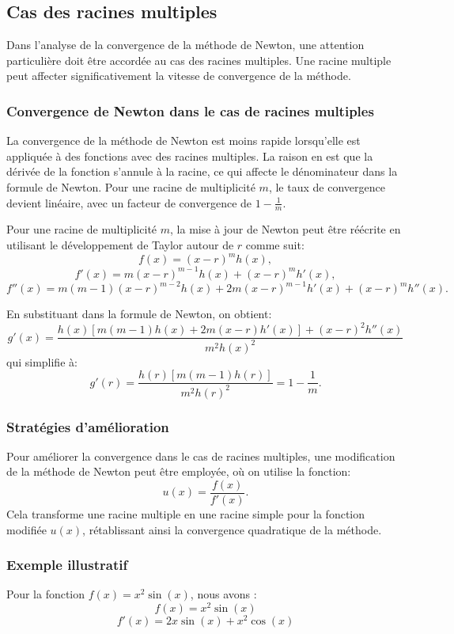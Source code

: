 \documentclass{article}
\begin{document}
\subsection{Cas des racines multiples}
Dans l'analyse de la convergence de la méthode de Newton, une attention particulière doit être accordée au cas des racines multiples. Une racine multiple peut affecter significativement la vitesse de convergence de la méthode.

\subsubsection{Convergence de Newton dans le cas de racines multiples}
La convergence de la méthode de Newton est moins rapide lorsqu'elle est appliquée à des fonctions avec des racines multiples. La raison en est que la dérivée de la fonction s'annule à la racine, ce qui affecte le dénominateur dans la formule de Newton. Pour une racine de multiplicité \(m\), le taux de convergence devient linéaire, avec un facteur de convergence de \(1 - \frac{1}{m}\).

Pour une racine de multiplicité \(m\), la mise à jour de Newton peut être réécrite en utilisant le développement de Taylor autour de \(r\) comme suit:
\[ f(x) = (x - r)^m h(x), \]
\[ f'(x) = m(x - r)^{m-1}h(x) + (x - r)^m h'(x), \]
\[ f''(x) = m(m-1)(x - r)^{m-2}h(x) + 2m(x - r)^{m-1}h'(x) + (x - r)^m h''(x). \]

En substituant dans la formule de Newton, on obtient:
\[ g'(x) = \frac{h(x) \left[ m(m - 1)h(x) + 2m(x - r)h'(x) \right] + (x - r)^2 h''(x)}{m^2 h(x)^2} \]
qui simplifie à:
\[ g'(r) = \frac{h(r) \left[ m(m - 1)h(r) \right]}{m^2 h(r)^2} = 1 - \frac{1}{m}. \]

\subsubsection{Stratégies d'amélioration}
Pour améliorer la convergence dans le cas de racines multiples, une modification de la méthode de Newton peut être employée, où on utilise la fonction:
\[ u(x) = \frac{f(x)}{f'(x)}. \]
Cela transforme une racine multiple en une racine simple pour la fonction modifiée \(u(x)\), rétablissant ainsi la convergence quadratique de la méthode.

\subsubsection{Exemple illustratif}
Pour la fonction \( f(x) = x^2 \sin(x) \), nous avons :
\[
f(x) = x^2 \sin(x)
\]
\[
f'(x) = 2x \sin(x) + x^2 \cos(x)
\]
\end{document}
